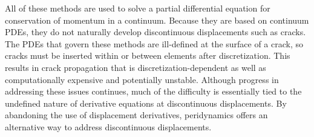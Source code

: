 All of these methods are used to solve a partial differential equation for conservation of momentum in a continuum. 
Because they are based on continuum PDEs, they do not naturally develop discontinuous displacements such as cracks. 
The PDEs that govern these methods are ill-defined at the surface of a crack, so cracks must be inserted within or between elements after discretization. 
This results in crack propagation that is discretization-dependent as well as computationally expensive and potentially unstable. 
Although progress in addressing these issues continues, much of the difficulty is essentially tied to the undefined nature of derivative equations at discontinuous displacements.
By abandoning the use of displacement derivatives, peridynamics offers an alternative way to address discontinuous displacements.
%

